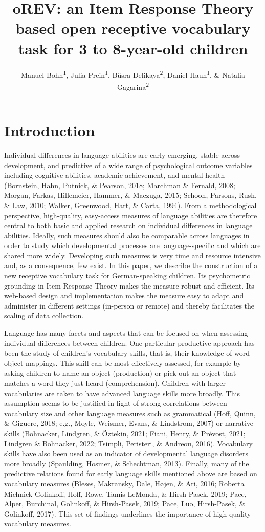 \documentclass[
  man,floatsintext]{apa6}
\title{oREV: an Item Response Theory based open receptive vocabulary task for 3 to 8-year-old children}
\author{Manuel Bohn\textsuperscript{1}, Julia Prein\textsuperscript{1}, Büsra Delikaya\textsuperscript{2}, Daniel Haun\textsuperscript{1}, \& Natalia Gagarina\textsuperscript{2}}
\date{}
\affiliation{\vspace{0.5cm}\textsuperscript{1} Department of Comparative Cultural Psychology, Max Planck Institute for Evolutionary Anthropology, Leipzig, Germany\\\textsuperscript{2} Leibniz-Zentrum Allgemeine Sprachwissenschaft, Berlin, Germany}
\begin{document}
\maketitle

\hypertarget{introduction}{%
\section{Introduction}\label{introduction}}

Individual differences in language abilities are early emerging, stable across development, and predictive of a wide range of psychological outcome variables including cognitive abilities, academic achievement, and mental health (Bornstein, Hahn, Putnick, \& Pearson, 2018; Marchman \& Fernald, 2008; Morgan, Farkas, Hillemeier, Hammer, \& Maczuga, 2015; Schoon, Parsons, Rush, \& Law, 2010; Walker, Greenwood, Hart, \& Carta, 1994). From a methodological perspective, high-quality, easy-access measures of language abilities are therefore central to both basic and applied research on individual differences in language abilities. Ideally, such measures should also be comparable across languages in order to study which developmental processes are language-specific and which are shared more widely. Developing such measures is very time and resource intensive and, as a consequence, few exist. In this paper, we describe the construction of a new receptive vocabulary task for German-speaking children. Its psychometric grounding in Item Response Theory makes the measure robust and efficient. Its web-based design and implementation makes the measure easy to adapt and administer in different settings (in-person or remote) and thereby facilitates the scaling of data collection.

Language has many facets and aspects that can be focused on when assessing individual differences between children. One particular productive approach has been the study of children's vocabulary skills, that is, their knowledge of word-object mappings. This skill can be most effectively assessed, for example by asking children to name an object (production) or pick out an object that matches a word they just heard (comprehension). Children with larger vocabularies are taken to have advanced language skills more broadly. This assumption seems to be justified in light of strong correlations between vocabulary size and other language measures such as grammatical (Hoff, Quinn, \& Giguere, 2018; e.g., Moyle, Weismer, Evans, \& Lindstrom, 2007) or narrative skills (Bohnacker, Lindgren, \& Öztekin, 2021; Fiani, Henry, \& Prévost, 2021; Lindgren \& Bohnacker, 2022; Tsimpli, Peristeri, \& Andreou, 2016). Vocabulary skills have also been used as an indicator of developmental language disorders more broadly (Spaulding, Hosmer, \& Schechtman, 2013). Finally, many of the predictive relations found for early language skills mentioned above are based on vocabulary measures (Bleses, Makransky, Dale, Højen, \& Ari, 2016; Roberta Michnick Golinkoff, Hoff, Rowe, Tamis-LeMonda, \& Hirsh-Pasek, 2019; Pace, Alper, Burchinal, Golinkoff, \& Hirsh-Pasek, 2019; Pace, Luo, Hirsh-Pasek, \& Golinkoff, 2017). This set of findings underlines the importance of high-quality vocabulary measures.
\end{document}
